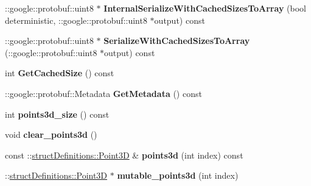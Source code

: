 \begin{DoxyCompactItemize}
\item 
\hypertarget{classstruct_definitions_1_1_data_package_aff3bd5e9b3552f259eab7476be9f4e16}{}\label{classstruct_definitions_1_1_data_package_aff3bd5e9b3552f259eab7476be9f4e16} 
\+::google\+::protobuf\+::uint8 $\ast$ {\bfseries Internal\+Serialize\+With\+Cached\+Sizes\+To\+Array} (bool deterministic, \+::google\+::protobuf\+::uint8 $\ast$output) const
\item 
\hypertarget{classstruct_definitions_1_1_data_package_a801ab15c731b364e80781936f15f4bf8}{}\label{classstruct_definitions_1_1_data_package_a801ab15c731b364e80781936f15f4bf8} 
\+::google\+::protobuf\+::uint8 $\ast$ {\bfseries Serialize\+With\+Cached\+Sizes\+To\+Array} (\+::google\+::protobuf\+::uint8 $\ast$output) const
\item 
\hypertarget{classstruct_definitions_1_1_data_package_acd1af6be3275b3b1bd260f140c5160c5}{}\label{classstruct_definitions_1_1_data_package_acd1af6be3275b3b1bd260f140c5160c5} 
int {\bfseries Get\+Cached\+Size} () const
\item 
\hypertarget{classstruct_definitions_1_1_data_package_acc3d48e85f9b60aef6bb3b6f976d53f3}{}\label{classstruct_definitions_1_1_data_package_acc3d48e85f9b60aef6bb3b6f976d53f3} 
\+::google\+::protobuf\+::\+Metadata {\bfseries Get\+Metadata} () const
\item 
\hypertarget{classstruct_definitions_1_1_data_package_aff208cb678a30b1ad5d010d397dda661}{}\label{classstruct_definitions_1_1_data_package_aff208cb678a30b1ad5d010d397dda661} 
int {\bfseries points3d\+\_\+size} () const
\item 
\hypertarget{classstruct_definitions_1_1_data_package_ac421f630bb82e5abb576de696bb23586}{}\label{classstruct_definitions_1_1_data_package_ac421f630bb82e5abb576de696bb23586} 
void {\bfseries clear\+\_\+points3d} ()
\item 
\hypertarget{classstruct_definitions_1_1_data_package_a5c089e2d9ec3e73caee935a97533914e}{}\label{classstruct_definitions_1_1_data_package_a5c089e2d9ec3e73caee935a97533914e} 
const \+::\hyperlink{classstruct_definitions_1_1_point3_d}{struct\+Definitions\+::\+Point3D} \& {\bfseries points3d} (int index) const
\item 
\hypertarget{classstruct_definitions_1_1_data_package_ae924e5f68d556f29dfa331a689b7bd06}{}\label{classstruct_definitions_1_1_data_package_ae924e5f68d556f29dfa331a689b7bd06} 
\+::\hyperlink{classstruct_definitions_1_1_point3_d}{struct\+Definitions\+::\+Point3D} $\ast$ {\bfseries mutable\+\_\+points3d} (int index)
\item 

\end{DoxyCompactItemize}
